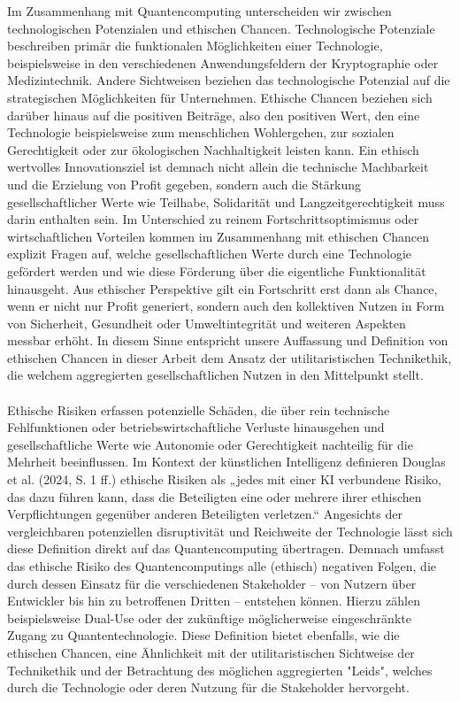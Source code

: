 Im Zusammenhang mit Quantencomputing unterscheiden wir zwischen technologischen Potenzialen und ethischen Chancen. Technologische Potenziale beschreiben primär die funktionalen Möglichkeiten einer Technologie, beispielsweise in den verschiedenen Anwendungsfeldern der Kryptographie oder Medizintechnik. Andere Sichtweisen beziehen das technologische Potenzial auf die strategischen Möglichkeiten für Unternehmen. Ethische Chancen beziehen sich darüber hinaus auf die positiven Beiträge, also den positiven Wert, den eine Technologie beispielsweise zum menschlichen Wohlergehen, zur sozialen Gerechtigkeit oder zur ökologischen Nachhaltigkeit leisten kann. Ein ethisch wertvolles Innovationsziel ist demnach nicht allein die technische Machbarkeit und die Erzielung von Profit gegeben, sondern auch die Stärkung gesellschaftlicher Werte wie Teilhabe, Solidarität und Langzeitgerechtigkeit muss darin enthalten sein. Im Unterschied zu reinem Fortschrittsoptimismus oder wirtschaftlichen Vorteilen kommen im Zusammenhang mit ethischen Chancen explizit Fragen auf, welche gesellschaftlichen Werte durch eine Technologie gefördert werden und wie diese Förderung über die eigentliche Funktionalität hinausgeht. Aus ethischer Perspektive gilt ein Fortschritt erst dann als Chance, wenn er nicht nur Profit generiert, sondern auch den kollektiven Nutzen in Form von Sicherheit, Gesundheit oder Umweltintegrität und weiteren Aspekten messbar erhöht. In diesem Sinne entspricht unsere Auffassung und Definition von ethischen Chancen in dieser Arbeit dem Ansatz der utilitaristischen Technikethik, die welchem aggregierten gesellschaftlichen Nutzen in den Mittelpunkt stellt. \cite{hoferPotentialbasedTechnologyPlanning2019} \cite{brusoniEthicsTechnologyOrganizational2017} \cite{bednarPowerEthicsUncovering2024}
\\
\\
Ethische Risiken erfassen potenzielle Schäden, die über rein technische Fehlfunktionen oder betriebswirtschaftliche Verluste hinausgehen und gesellschaftliche Werte wie Autonomie oder Gerechtigkeit nachteilig für die Mehrheit beeinflussen. Im Kontext der künstlichen Intelligenz definieren Douglas et al. (2024, S. 1 ff.) ethische Risiken als „jedes mit einer KI verbundene Risiko, das dazu führen kann, dass die Beteiligten eine oder mehrere ihrer ethischen Verpflichtungen gegenüber anderen Beteiligten verletzen.“ Angesichts der vergleichbaren potenziellen disruptivität und Reichweite der Technologie lässt sich diese Definition direkt auf das Quantencomputing übertragen. Demnach umfasst das ethische Risiko des Quantencomputings alle (ethisch) negativen Folgen, die durch dessen Einsatz für die verschiedenen Stakeholder – von Nutzern über Entwickler bis hin zu betroffenen Dritten – entstehen können. Hierzu zählen beispielsweise Dual-Use oder der zukünftige möglicherweise eingeschränkte Zugang zu Quantentechnologie. Diese Definition bietet ebenfalls, wie die ethischen Chancen, eine Ähnlichkeit mit der utilitaristischen Sichtweise der Technikethik und der Betrachtung des möglichen aggregierten "Leids", welches durch die Technologie oder deren Nutzung für die Stakeholder hervorgeht. \cite{douglasEthicalRiskAI2025} 
